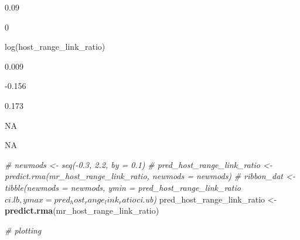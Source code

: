 \documentclass[
]{article}
\newenvironment{Shaded}{\begin{snugshade}}{\end{snugshade}}
\newcommand{\CommentTok}[1]{\textcolor[rgb]{0.56,0.35,0.01}{\textit{#1}}}
\newcommand{\KeywordTok}[1]{\textcolor[rgb]{0.13,0.29,0.53}{\textbf{#1}}}
\newcommand{\NormalTok}[1]{#1}
\begin{document}
0.09

0

log(host\_range\_link\_ratio)

0.009

-0.156

0.173

NA

NA

\begin{Shaded}
\begin{Highlighting}[]
\CommentTok{# newmods <- seq(-0.3, 2.2, by = 0.1)}
\CommentTok{# pred_host_range_link_ratio <-predict.rma(mr_host_range_link_ratio, newmods = newmods) }
\CommentTok{# ribbon_dat <- tibble(newmods = newmods, ymin = pred_host_range_link_ratio$ci.lb, ymax = pred_host_range_link_ratio$ci.ub)}
\NormalTok{pred_host_range_link_ratio <-}\KeywordTok{predict.rma}\NormalTok{(mr_host_range_link_ratio) }

\CommentTok{# plotting}


\end{Highlighting}
\end{Shaded}
\end{document}
